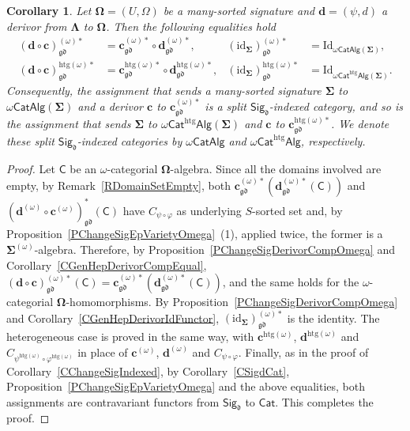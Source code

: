 \documentclass[a4paper, reqno]{amsbook}
\newcommand{\sig}[1]{\mathbf{#1}}             %
\newcommand{\calg}[1]{\boldsymbol{\mathsf{#1}}} %
\newcommand{\gd}{\mathfrak{gd}}              %
\newcommand{\htg}{\mathrm{htg}}                %
\newcommand{\id}{\mathrm{id}}
\newcommand{\Id}{\mathrm{Id}}
\theoremstyle{plain}
\newtheorem{corollary}[theorem]{Corollary}
\theoremstyle{definition}
\begin{document}
\begin{corollary}\label{CChangeSigIndexedOmega}
Let $\sig{\Omega}=(U,\Omega)$ be a many-sorted signature and $\mathbf{d}=(\psi,d)$ a derivor from $\sig{\Lambda}$ to $\sig{\Omega}$.
Then the following equalities hold
\begin{align*}
(\mathbf{d}\circ\mathbf{c})^{(\omega)\ast}_{\gd}&=\mathbf{c}^{(\omega)\ast}_{\gd}\circ\mathbf{d}^{(\omega)\ast}_{\gd},
&
(\id_{\sig{\Sigma}})^{(\omega)\ast}_{\gd}&=\Id_{\omega\mathsf{CatAlg}(\sig{\Sigma})},
\\
(\mathbf{d}\circ\mathbf{c})^{\htg(\omega)\ast}_{\gd}&=\mathbf{c}^{\htg(\omega)\ast}_{\gd}\circ\mathbf{d}^{\htg(\omega)\ast}_{\gd},
&
(\id_{\sig{\Sigma}})^{\htg(\omega)\ast}_{\gd}&=\Id_{\omega\mathsf{Cat}^{\htg}\mathsf{Alg}(\sig{\Sigma})}.
\end{align*}
Consequently, the assignment that sends a many-sorted signature $\sig{\Sigma}$ to $\omega\mathsf{CatAlg}(\sig{\Sigma})$ and a derivor $\mathbf{c}$ to $\mathbf{c}^{(\omega)\ast}_{\gd}$ is a split $\mathsf{Sig}_{\mathfrak{d}}$-indexed category, and so is the assignment that sends $\sig{\Sigma}$ to $\omega\mathsf{Cat}^{\htg}\mathsf{Alg}(\sig{\Sigma})$ and $\mathbf{c}$ to $\mathbf{c}^{\htg(\omega)\ast}_{\gd}$.
We denote these split $\mathsf{Sig}_{\mathfrak{d}}$-indexed categories by $\omega\mathsf{CatAlg}$ and $\omega\mathsf{Cat}^{\htg}\mathsf{Alg}$, respectively.
\end{corollary}
\begin{proof}
Let $\calg{C}$ be an $\omega$-categorial $\sig{\Omega}$-algebra.
Since all the domains involved are empty, by Remark~\ref{RDomainSetEmpty}, both $\mathbf{c}^{(\omega)\ast}_{\gd}(\mathbf{d}^{(\omega)\ast}_{\gd}(\calg{C}))$ and $(\mathbf{d}^{(\omega)}\circ\mathbf{c}^{(\omega)})^{\ast}_{\gd}(\calg{C})$ have $C_{\psi\circ\varphi}$ as underlying $S$-sorted set and, by Proposition~\ref{PChangeSigEpVarietyOmega}~(1), applied twice, the former is a $\sig{\Sigma}^{(\omega)}$-algebra.
Therefore, by Proposition~\ref{PChangeSigDerivorCompOmega} and Corollary~\ref{CGenHepDerivorCompEqual}, $(\mathbf{d}\circ\mathbf{c})^{(\omega)\ast}_{\gd}(\calg{C})=\mathbf{c}^{(\omega)\ast}_{\gd}(\mathbf{d}^{(\omega)\ast}_{\gd}(\calg{C}))$, and the same holds for the $\omega$-categorial $\sig{\Omega}$-homomorphisms.
By Proposition~\ref{PChangeSigDerivorCompOmega} and Corollary~\ref{CGenHepDerivorIdFunctor}, $(\id_{\sig{\Sigma}})^{(\omega)\ast}_{\gd}$ is the identity.
The heterogeneous case is proved in the same way, with $\mathbf{c}^{\htg(\omega)}$, $\mathbf{d}^{\htg(\omega)}$ and $C_{\psi^{\htg(\omega)}\circ\varphi^{\htg(\omega)}}$ in place of $\mathbf{c}^{(\omega)}$, $\mathbf{d}^{(\omega)}$ and $C_{\psi\circ\varphi}$.
Finally, as in the proof of Corollary~\ref{CChangeSigIndexed}, by Corollary~\ref{CSigdCat}, Proposition~\ref{PChangeSigEpVarietyOmega} and the above equalities, both assignments are contravariant functors from $\mathsf{Sig}_{\mathfrak{d}}$ to $\mathsf{Cat}$. This completes the proof.
\end{proof}
\end{document}
